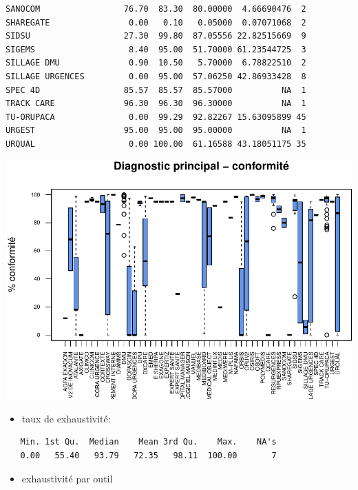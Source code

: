 \documentclass[]{article}
\begin{document}
\begin{verbatim}
SANOCOM                 76.70  83.30  80.00000  4.66690476  2
SHAREGATE                0.00   0.10   0.05000  0.07071068  2
SIDSU                   27.30  99.80  87.05556 22.82515669  9
SIGEMS                   8.40  95.00  51.70000 61.23544725  3
SILLAGE DMU              0.90  10.50   5.70000  6.78822510  2
SILLAGE URGENCES         0.00  95.00  57.06250 42.86933428  8
SPEC 4D                 85.57  85.57  85.57000          NA  1
TRACK CARE              96.30  96.30  96.30000          NA  1
TU-ORUPACA               0.00  99.29  92.82267 15.63095899 45
URGEST                  95.00  95.00  95.00000          NA  1
URQUAL                   0.00 100.00  61.16588 43.18051175 35
\end{verbatim}

\includegraphics{septembre2015_files/figure-latex/unnamed-chunk-18-1.pdf}

\begin{itemize}
\itemsep1pt\parskip0pt
\item
  taux de exhaustivité:
\end{itemize}

\begin{verbatim}
   Min. 1st Qu.  Median    Mean 3rd Qu.    Max.    NA's 
   0.00   55.40   93.79   72.35   98.11  100.00       7 
\end{verbatim}

\begin{itemize}
\itemsep1pt\parskip0pt
\item
  exhaustivité par outil
\end{itemize}
\end{document}
